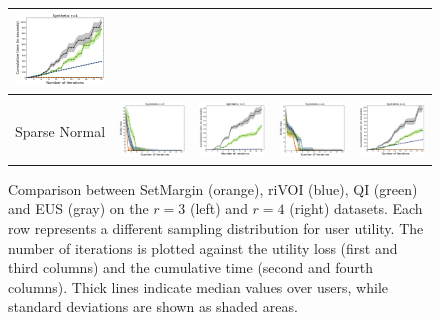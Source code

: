 \documentclass{article}
\renewcommand\[{\begin{equation}}
\renewcommand\]{\end{equation}}
\begin{document}
\begin{figure}[t]
{\begin{tabular}{ccccc}
        \includegraphics[align=c,width=10em]{figures/synthetic_vs_others_4_uniform_sparse_per_iter_time}
        \\
        \hline
        \\
        {\sc Sparse Normal} &
        \includegraphics[align=c,width=10em]{figures/synthetic_vs_others_3_normal_sparse_per_iter_loss} &
        \includegraphics[align=c,width=10em]{figures/synthetic_vs_others_3_normal_sparse_per_iter_time} &
        \includegraphics[align=c,width=10em]{figures/synthetic_vs_others_4_normal_sparse_per_iter_loss} &
        \includegraphics[align=c,width=10em]{figures/synthetic_vs_others_4_normal_sparse_per_iter_time}
        \\
    \end{tabular}
    }
    \caption{\label{fig:comparison} Comparison between {\sc SetMargin}
      (orange), {\sc riVOI} (blue), {\sc QI} (green) and {\sc EUS}
      (gray) on the $r=3$ (left) and $r=4$ (right) datasets. Each row
      represents a different sampling distribution for user utility.
      The number of iterations is plotted against the utility loss
      (first and third columns) and the cumulative time (second and
      fourth columns). Thick lines indicate median values over users,
      while standard deviations are shown as shaded areas.}
\end{figure}
\end{document}
